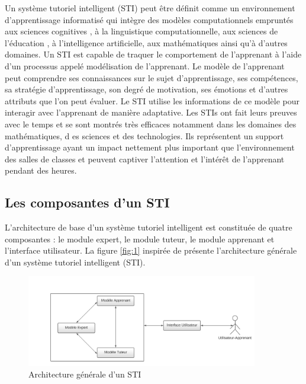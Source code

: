 Un système tutoriel intelligent (STI) peut être définit comme un environnement d'apprentissage informatisé qui intègre des modèles computationnels empruntés aux sciences cognitives , à la linguistique computationnelle, aux sciences de l'éducation , à l'intelligence artificielle, aux mathématiques ainsi qu'à d'autres domaines. Un STI est capable de traquer le comportement de l'apprenant à l'aide d'un processus appelé modélisation de l'apprenant. Le modèle de l'apprenant peut comprendre ses connaissances sur le sujet d'apprentissage, ses compétences, sa stratégie d'apprentissage, son degré de motivation, ses émotions
et d'autres attributs que l'on peut évaluer. Le STI utilise les informations de ce modèle pour interagir avec l'apprenant de manière adaptative. Les STIs ont fait leurs preuves avec le temps et se sont montrés très efficaces notamment dans les domaines des mathématiques, d es sciences et des technologies. Ils représentent un support d'apprentissage ayant un impact nettement plus
important que l'environnement des salles de classes et peuvent captiver l'attention et l'intérêt de l'apprenant pendant des heures.


\subsection{Les composantes d'un STI}


L'architecture de base d'un système tutoriel intelligent est constituée de quatre composantes : le module expert, le module tuteur, le module apprenant et l'interface utilisateur. La figure \autoref{fig:1} inspirée de \cite{nkambou2010advances} présente l'architecture générale d'un système tutoriel intelligent (STI).

\begin{figure}
    \centering
    \includegraphics[width=0.9\textwidth]{figures/archi_STI_gen.png}
    \captionsetup{justification=centering}
    \caption{Architecture générale d'un STI}
 \label{fig:1}
\end{figure}


